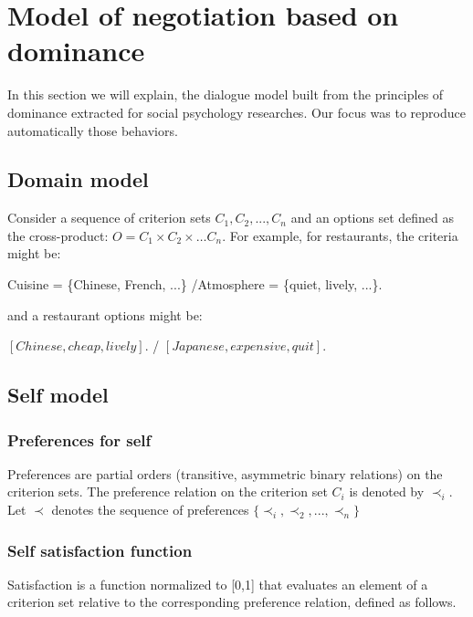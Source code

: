 \documentclass{llncs}
\begin{document}
	\section{Model of negotiation based on dominance}
		In this section we will explain, the dialogue model built from the principles of dominance extracted for social psychology researches. Our focus was to reproduce automatically those behaviors.
		\subsection{Domain model}
				Consider a sequence of criterion sets $C_1, C_2, ..., C_n$ and an options set defined as the cross-product:
				$O = C_1 \times C_2 \times \ldots C_n$.
				For example, for restaurants, the criteria might be:
				
				Cuisine = \{Chinese, French, ...\} /Atmosphere = \{quiet, lively, ...\}. 
				
				and a restaurant options might be: 
				
				$[Chinese, cheap, lively]$. / $[Japanese, expensive, quit]$.   
				\subsection{Self model} 
				
				\subsubsection{Preferences for self}
				Preferences are partial orders (transitive, asymmetric binary relations) on the criterion sets. The preference relation on the criterion set $C_i$ is denoted by $\prec_i$.			
				Let $\prec$ denotes the sequence of preferences $\{ \prec_i, \prec_2, ..., \prec_n\}$
				
				\subsubsection{Self satisfaction function} 
				
				Satisfaction is a function normalized to [0,1] that evaluates an element of a criterion set relative to the corresponding preference relation, defined as follows.
				
\end{document}
